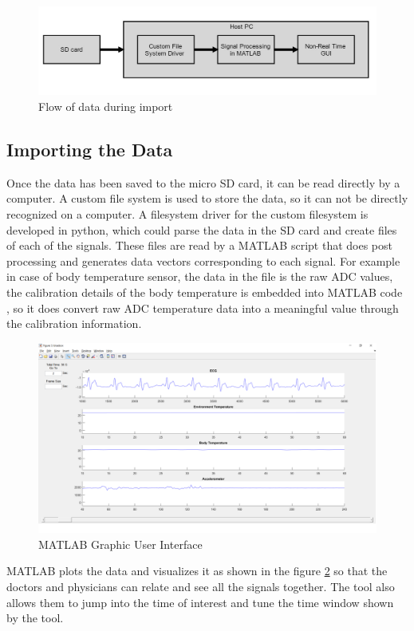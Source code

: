 \begin{figure}[h]
	\centering
	\includegraphics[scale = 0.5 ]{play_dataflow.JPG}
	\caption{Flow of data during import \label{play_dataflow}}
\end{figure}
\subsection{Importing the Data}
Once the data has been saved to the micro SD card, it can be read directly by a computer. A custom file system is used to store the data, so it can not be directly recognized on a computer. A filesystem driver for the custom filesystem is developed in python, which could parse the data in the SD card and create files of each of the signals. These files are read by a MATLAB script that does post processing and generates data vectors corresponding to each signal. For example in case of body temperature sensor, the data in the file is the raw ADC values, the calibration details of the body temperature is embedded into MATLAB code , so it does convert raw ADC temperature  data into a meaningful value through the calibration information.  



 \begin{figure}[h]
	\centering  
	\includegraphics[scale = 0.4 ]{MATLAB_GUI.png}
	\caption{MATLAB Graphic User Interface \label{fig:matlab_gui}}
\end{figure}

MATLAB plots the data and visualizes it as shown in the figure \ref{fig:matlab_gui} so that the doctors and physicians can relate and see all the signals together. The tool also allows them to jump into the time of interest and tune the time window shown by the tool. 

